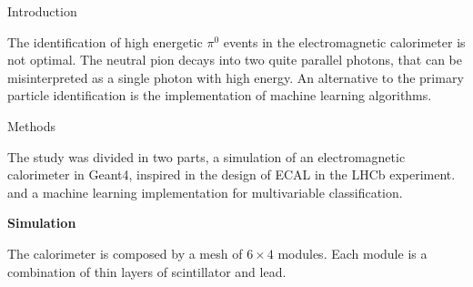 \documentclass{beamer}
\newlength{\sepwidthA} %
\newlength{\colwidthA} %
\newcommand{\separatorcolumnA}{\begin{column}{\sepwidthA}\end{column}}
\newlength{\colwidthB}
\begin{document}
\begin{frame}{}
\begin{columns}[t]
\begin{column}{\colwidthA}
      \end{column}

      \separatorcolumnA
    \end{columns}

    \begin{columns}

      \begin{column}[T]{\colwidthB}

        \begin{block}{Introduction}

          The identification of high energetic \(\pi^0\) events in the
          electromagnetic calorimeter is not optimal. The neutral pion decays
          into two quite parallel photons, that can be misinterpreted as a
          single photon with high energy. An alternative to the primary
          particle identification is the implementation of machine learning
          algorithms\cite{Boldyrev_2020}.

        \end{block}

        \begin{block}{Methods}

          The study was divided in two parts, a simulation of an
          electromagnetic calorimeter in Geant4, inspired in the design of ECAL
          in the LHCb experiment. and a machine learning implementation for
          multivariable classification.

          \textbf{Simulation}

          The calorimeter is composed by a mesh of \(6\times4\) modules. Each
          module is a combination of thin layers of scintillator and lead.

          \begin{figure}[htb]
            \centering

            \hspace{2em}


\end{figure}
\end{block}
\end{column}
\end{columns}
\end{frame}
\end{document}

